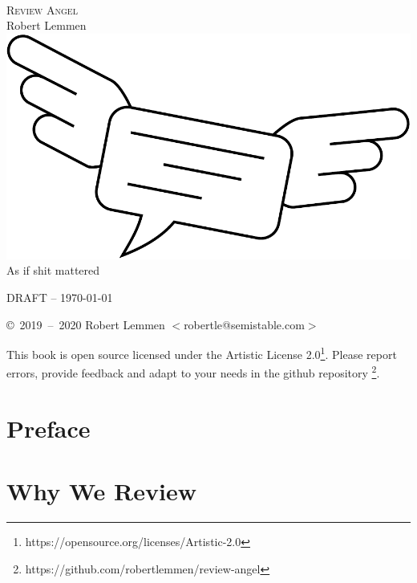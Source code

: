 \documentclass[10pt,twoside]{article}
\begin{document}
\begin{titlepage}
\begin{center}~\\
\vspace{2em}
{\Huge\scshape Review Angel}\\
\vspace{16pt}
{\large Robert Lemmen}
\vfill\vfill
\includegraphics[width=\textwidth]{logo}
\vfill
{\large As if shit mattered}
\end{center}
\end{titlepage}
\thispagestyle{empty}
\clearpage

DRAFT -- \today

\vspace{1.5em}
\copyright~2019~--~2020 Robert Lemmen $<$robertle@semistable.com$>$


\vspace{1.5em}
This book is open source licensed under the Artistic License 2.0\footnote{
https://opensource.org/licenses/Artistic-2.0}. Please report errors, provide
feedback and adapt to your needs in the github repository \footnote{
https://github.com/robertlemmen/review-angel}.
\thispagestyle{empty}
\clearpage

\tableofcontents
\clearpage

\section{Preface}
\section{Why We Review}

\lipsum

\lipsum
\clearpage
\layout
\end{document}
